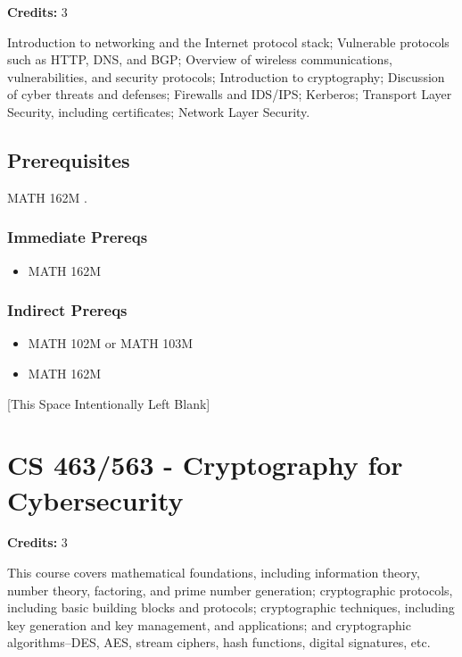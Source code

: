 \documentclass[]{article}
\providecommand{\tightlist}{%
  \setlength{\itemsep}{0pt}\setlength{\parskip}{0pt}}
\newcommand{\pagebreakhere}{
\vspace*{\fill}
\begin{center}
[This Space Intentionally Left Blank]
\end{center}
\vspace*{\fill}
\newpage
}
\begin{document}
\textbf{Credits:} 3

Introduction to networking and the Internet protocol stack; Vulnerable
protocols such as HTTP, DNS, and BGP; Overview of wireless
communications, vulnerabilities, and security protocols; Introduction to
cryptography; Discussion of cyber threats and defenses; Firewalls and
IDS/IPS; Kerberos; Transport Layer Security, including certificates;
Network Layer Security.

\subsection{Prerequisites}\label{prerequisites-39}

MATH 162M .

\subsubsection{Immediate Prereqs}\label{immediate-prereqs-30}

\begin{itemize}
\tightlist
\item
  MATH 162M
\end{itemize}

\subsubsection{Indirect Prereqs}\label{indirect-prereqs-30}

\begin{itemize}
\tightlist
\item
  MATH 102M or MATH 103M
\item
  MATH 162M
\end{itemize}

\pagebreakhere
\section{CS 463/563 - Cryptography for
Cybersecurity}\label{cs-463563---cryptography-for-cybersecurity}

\textbf{Credits:} 3

This course covers mathematical foundations, including information
theory, number theory, factoring, and prime number generation;
cryptographic protocols, including basic building blocks and protocols;
cryptographic techniques, including key generation and key management,
and applications; and cryptographic algorithms--DES, AES, stream
ciphers, hash functions, digital signatures, etc.
\end{document}
